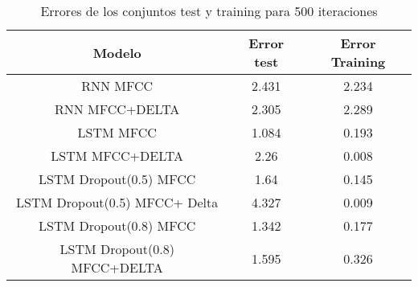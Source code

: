 \begin{table}[H]
	\centering
	\begin{tabular}{|c|c|c|}
		\hline
		\rowcolor{Gray}  Modelo & Error test& Error Training \\ \hline
		RNN MFCC&        2.431  &             2.234       \\ \hline
		RNN MFCC+DELTA&  2.305  &             2.289      \\ \hline
		LSTM MFCC&        1.084  &          0.193         \\ \hline
		LSTM MFCC+DELTA&  2.26  &           0.008      \\ \hline
		LSTM Dropout(0.5) MFCC&  1.64         &     0.145           \\ \hline
		LSTM Dropout(0.5) MFCC+ Delta &4.327 &0.009 \\\hline
		LSTM Dropout(0.8) MFCC&	1.342		&	0.177	\\ \hline
		LSTM Dropout(0.8) MFCC+DELTA&	1.595		&	0.326	\\ \hline
	\end{tabular}
	\caption{Errores de los conjuntos test y training para 500 iteraciones}
\end{table}
